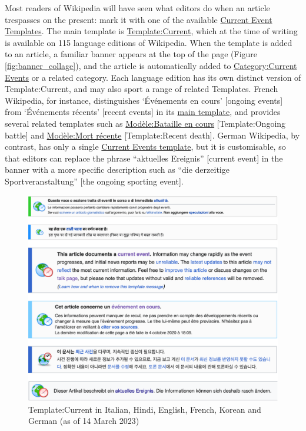 \documentclass[Royal,times,sageh]{sagej}
\begin{document}
Most readers of Wikipedia will have seen what editors do when an article
trespasses on the present: mark it with one of the available
\href{https://en.wikipedia.org/wiki/Wikipedia:Current_event_templates}{Current
Event Templates}. The main template is
\href{https://en.wikipedia.org/wiki/Template:Current}{Template:Current},
which at the time of writing is available on 115 language editions of
Wikipedia. When the template is added to an article, a familiar banner
appears at the top of the page (Figure \ref{fig:banner_collage}), and
the article is automatically added to
\href{https://en.wikipedia.org/wiki/Category:Current_events}{Category:Current
Events} or a related category. Each language edition has its own
distinct version of Template:Current, and may also sport a range of
related Templates. French Wikipedia, for instance, distinguishes
`Événements en cours' {[}ongoing events{]} from `Événements récents'
{[}recent events{]} in its
\href{https://fr.wikipedia.org/wiki/Mod\%C3\%A8le:\%C3\%89v\%C3\%A9nement_en_cours}{main
template}, and provides several related templates such as
\href{https://fr.wikipedia.org/wiki/Mod\%C3\%A8le:Bataille_en_cours}{Modèle:Bataille
en cours} {[}Template:Ongoing battle{]} and
\href{https://fr.wikipedia.org/wiki/Mod\%C3\%A8le:Mort_r\%C3\%A9cente}{Modèle:Mort
récente} {[}Template:Recent death{]}. German Wikipedia, by contrast, has
only a single
\href{https://de.wikipedia.org/wiki/Vorlage:Laufendes_Ereignis}{Current
Events template}, but it is customisable, so that editors can replace
the phrase ``aktuelles Ereignis'' {[}current event{]} in the banner with
a more specific description such as ``die derzeitige
Sportveranstaltung'' {[}the ongoing sporting event{]}.

\begin{figure}
\includegraphics[width=1\linewidth]{images/banner_collage} \caption{Template:Current in Italian, Hindi, English, French, Korean and German (as of 14 March 2023)\label{fig:banner_collage}}\label{fig:unnamed-chunk-1}
\end{figure}
\end{document}
